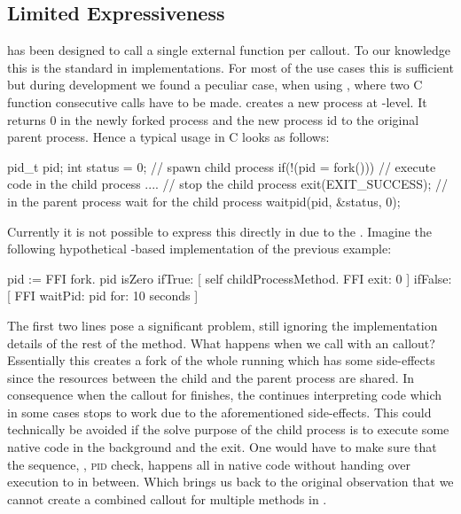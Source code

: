 \subsection{Limited Expressiveness}

\NB has been designed to call a single external function per callout.
To our knowledge this is the standard in \FFI implementations.
For most of the use cases this is sufficient but during development we found a peculiar case, when using , where two C function consecutive calls have to be made.
 creates a new process at \OS-level.
It returns $0$ in the newly forked process and the new process id to the original parent process.
Hence a typical  usage in C looks as follows:
%
\begin{ccode}{}
pid_t pid;
int status = 0;
// spawn child process 
if(!(pid = fork())) {
	// execute code in the child process
	....
	// stop the child process
	exit(EXIT_SUCCESS);
}
// in the parent process wait for the child process
waitpid(pid, &status, 0);	
\end{ccode}
%
Currently it is not possible to express this directly in \NB due to the \VM.
Imagine the following hypothetical \NB-based implementation of the previous example:
%
\begin{stcode}{}
pid := FFI fork.
pid isZero
	ifTrue: [ 
		self childProcessMethod.
		FFI exit: 0 ]
	ifFalse: [ 
		FFI waitPid: pid for: 10 seconds ]
\end{stcode}
%
The first two lines pose a significant problem, still ignoring the implementation details of the rest of the method.
What happens when we call  with an \FFI callout?
Essentially this creates a fork of the whole \VM running \PH which has some side-effects since the resources between the child and the parent \VM process are shared.
In consequence when the \FFI callout for  finishes, the \VM continues interpreting \PH code which in some cases stops to work due to the aforementioned side-effects.
This could technically be avoided if the solve purpose of the child process is to execute some native code in the background and the exit.
One would have to make sure that the sequence, , \textsc{pid} check,  happens all in native code without handing over execution to \PH in between.
Which brings us back to the original observation that we cannot create a combined \FFI callout for multiple methods in \NB.

